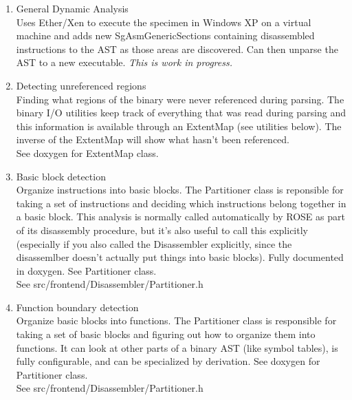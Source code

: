 \begin{enumerate}
\begin{enumerate}
      \item General Dynamic Analysis \\
      Uses Ether/Xen to execute the specimen in Windows XP on a
      virtual machine and adds new SgAsmGenericSections containing
      disassembled instructions to the AST as those areas
      are discovered.  Can then unparse the AST to a new executable.
      {\em This is work in progress.}

      \item Detecting unreferenced regions \\
      Finding what regions of the binary were never referenced
      during parsing.  The binary I/O utilities keep track of
      everything that was read during parsing and this information
      is available through an ExtentMap (see utilities below). The
      inverse of the ExtentMap will show what hasn't been
      referenced.\\
      See doxygen for ExtentMap class.

      \item Basic block detection \\
      Organize instructions into basic blocks.  The Partitioner
      class is reponsible for taking a set of instructions and
      deciding which instructions belong together in a basic
      block. This analysis is normally called automatically by ROSE
      as part of its disassembly procedure, but it's also useful to
      call this explicitly (especially if you also called the
      Disassembler explicitly, since the disassemlber doesn't
      actually put things into basic blocks).
      Fully documented in doxygen. See Partitioner class. \\
      See src/frontend/Disassembler/Partitioner.h

      \item Function boundary detection \\
      Organize basic blocks into functions. The Partitioner class is
      responsible for taking a set of basic blocks and figuring out
      how to organize them into functions. It can look at other
      parts of a binary AST (like symbol tables), is fully
      configurable, and can be specialized by derivation.
      See doxygen for Partitioner class. \\
      See src/frontend/Disassembler/Partitioner.h

   \end{enumerate}
\end{enumerate}

